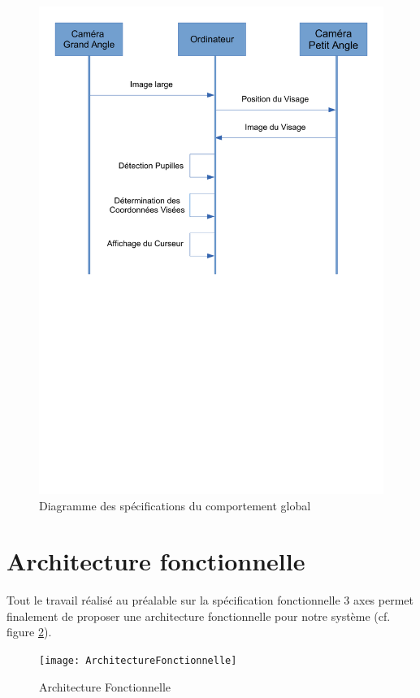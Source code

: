\begin{figure}[H]
  \centering
  \includegraphics[scale=0.6]{comportementGlobal}
  \caption{Diagramme des spécifications du comportement global}
  \label{fig:comportementGlobal}
\end{figure}

\section{Architecture fonctionnelle}

Tout le travail réalisé au préalable sur la spécification fonctionnelle 3 axes permet finalement de proposer une architecture fonctionnelle pour notre système (cf. figure \ref{fig:archiFonctionnelle}).
 
\begin{figure}[H]
  \centering
  \texttt{[image: ArchitectureFonctionnelle]}
  \caption{Architecture Fonctionnelle}
  \label{fig:archiFonctionnelle}
\end{figure}

